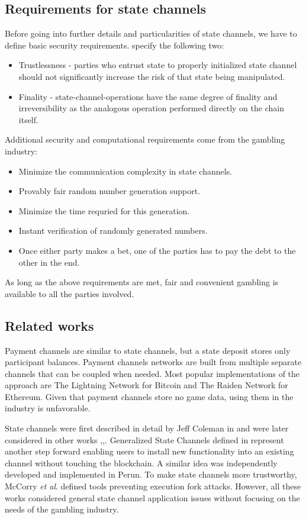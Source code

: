 		\subsection {Requirements for state channels}
	Before going into further details and particularities of state channels, we have to define basic security requirements.\cite{bib1} specify the following two:
	\begin{itemize}
		\item Trustlessness - parties who entrust state to properly initialized state channel should not significantly increase the risk of that state being manipulated. 
		\item Finality - state-channel-operations have the same degree of finality and irreversibility as the analogous operation performed directly on the chain itself.
	\end{itemize}
	Additional security and computational requirements come from the gambling industry:
	\begin{itemize}
		\item Minimize the communication complexity in state channels.
		\item Provably fair random number generation support.
		\item Minimize the time requried for this generation.
		\item Instant verification of randomly generated numbers.
		\item Once either party makes a bet, one of the parties has to pay the debt to the other in the end. 
	\end{itemize}

	As long as the above requirements are met, fair and convenient gambling is available to all the parties involved.

		\subsection {Related works} 
	Payment channels \cite{bib11, bib12, bib13} are similar to state channels, but a state deposit stores only participant balances. Payment channels networks are built from multiple separate channels that can be coupled when needed. Most popular implementations of the approach are The Lightning Network for Bitcoin and The Raiden Network for Ethereum. Given that payment channels store no game data, using them in the industry is unfavorable. 

	State channels were first described in detail by Jeff Coleman in \cite{bib5} and were later considered in other works \cite{bib6},\cite{bib7},\cite{bib8}. Generalized State Channels defined in \cite{bib1} represent another step forward enabling users to install new functionality into an existing channel without touching the blockchain. A similar idea was independently developed and implemented in Perun\cite{bib14}. To make state channels more trustworthy, McCorry \textit {et al}. \cite{bib9} defined tools preventing execution fork attacks. However, all these works considered general state channel application issues without focusing on the needs of the gambling industry.


